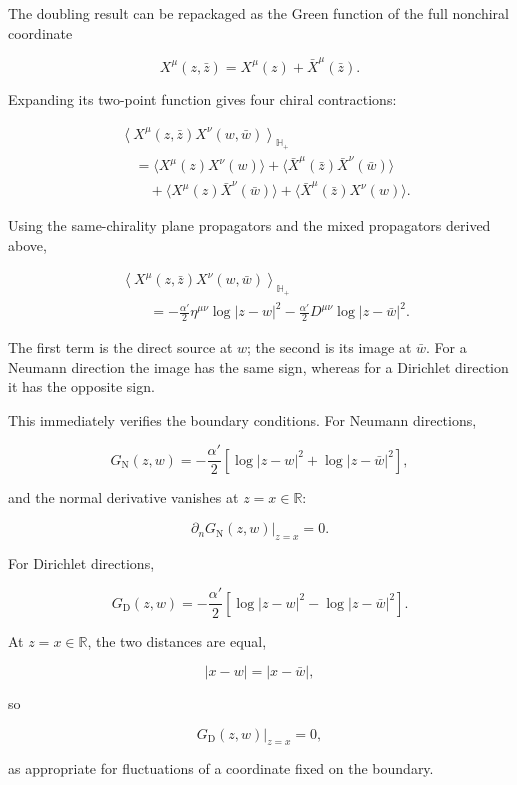 \documentclass[
  10pt,
  a4paper,
  openany]{book}
\begin{document}
The doubling result can be repackaged as the Green function of the full
nonchiral coordinate

\[
X^\mu(z,\bar z)=X^\mu(z)+\bar X^\mu(\bar z).
\]

Expanding its two-point function gives four chiral contractions:

\[
\begin{aligned}
&\left\langle X^\mu(z,\bar z)X^\nu(w,\bar w)\right\rangle_{\mathbb H_+}\\
&\quad=
\langle X^\mu(z)X^\nu(w)\rangle
+\langle\bar X^\mu(\bar z)\bar X^\nu(\bar w)\rangle\\
&\qquad
+\langle X^\mu(z)\bar X^\nu(\bar w)\rangle
+\langle\bar X^\mu(\bar z)X^\nu(w)\rangle.
\end{aligned}
\]

Using the same-chirality plane propagators and the mixed propagators
derived above,

\[
\boxed{
\begin{aligned}
&\left\langle X^\mu(z,\bar z)X^\nu(w,\bar w)\right\rangle_{\mathbb H_+}\\
&\qquad=
-\frac{\alpha'}2\eta^{\mu\nu}\log|z-w|^2
-\frac{\alpha'}2D^{\mu\nu}\log|z-\bar w|^2.
\end{aligned}
}
\]

The first term is the direct source at \(w\); the second is its image at
\(\bar w\). For a Neumann direction the image has the same sign, whereas
for a Dirichlet direction it has the opposite sign.

This immediately verifies the boundary conditions. For Neumann
directions,

\[
G_{\mathrm N}(z,w)
=-\frac{\alpha'}2
\left[\log|z-w|^2+\log|z-\bar w|^2\right],
\]

and the normal derivative vanishes at \(z=x\in\mathbb R\):

\[
\left.\partial_nG_{\mathrm N}(z,w)\right|_{z=x}=0.
\]

For Dirichlet directions,

\[
G_{\mathrm D}(z,w)
=-\frac{\alpha'}2
\left[\log|z-w|^2-\log|z-\bar w|^2\right].
\]

At \(z=x\in\mathbb R\), the two distances are equal,

\[
|x-w|=|x-\bar w|,
\]

so

\[
\left.G_{\mathrm D}(z,w)\right|_{z=x}=0,
\]

as appropriate for fluctuations of a coordinate fixed on the boundary.
\end{document}
